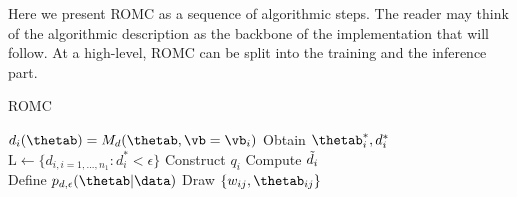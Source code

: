 Here we present ROMC as a sequence of algorithmic steps. The reader
may think of the algorithmic description as the backbone of the
implementation that will follow. At a high-level, ROMC can be split
into the training and the inference part.



\begin{algorithm}[!ht]
	\caption{ROMC}\label{alg:romc_algorithm}
	\begin{algorithmic}[1]
      \State $d_i(\thetab) = M_d(\thetab, \vb=\vb_i)$ 
      \State Obtain $\thetab_i^*, d_i^*$ 
    \EndFor
    \State $\text{L} \gets \{d_{i, i = 1, ..., n_1}: d_i^* < \epsilon \} $ 
      \State Construct $q_i$ 
      \State Compute $\Tilde{d}_i$ 
    \EndFor
    \\\hrulefill
    \State Define $p_{d,\epsilon}(\thetab|\data)$ 
    \State Draw $\{w_{ij}, \thetab_{ij}\}$ 
    \EndProcedure
	\end{algorithmic}
\end{algorithm}




